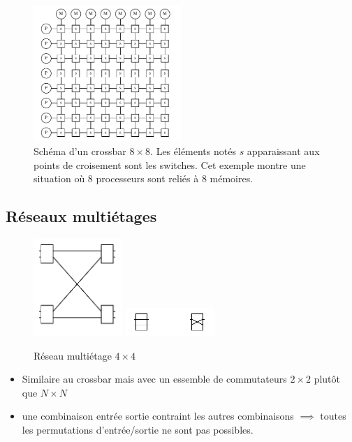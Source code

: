\documentclass[12pt,a4paper,oneside, titlepage]{article}
\begin{document}
      \begin{figure}[H]
        \centering
        \includegraphics[width=0.5\textwidth]{images/cross}
        \caption{Schéma d’un crossbar $8 \times 8$. Les éléments notés $s$ apparaissant aux points de croisement sont les switches. Cet exemple montre une situation où 8 processeurs sont reliés à 8 mémoires.}
      \end{figure}

    \subsection*{Réseaux multiétages}

    \begin{figure}[H]
      \centering
      \includegraphics[width=0.3\textwidth]{images/multi1}
      \includegraphics[width=0.3\textwidth]{images/multi2}
      \caption{Réseau multiétage $4 \times 4$}
    \end{figure}

      \begin{itemize}
        \item Similaire au crossbar mais avec un essemble de commutateurs $2 \times 2$ plutôt que $N \times N$
        \item une combinaison entrée sortie contraint les autres combinaisons $\implies$ toutes les permutations d'entrée/sortie ne sont pas possibles.
      \end{itemize}
\end{document}
